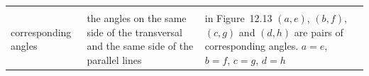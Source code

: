 \begin{center}
\begin{xtabular*}{\mytablewidth}[t]{|p{3cm}|p{3cm}|p{3cm}|p{20\mystarwidth}|}
\begin{center}
    \end{center}



    \addtocounter{footnote}{-0}
    
     \tabularnewline{}
    
    
        corresponding angles &
    
    
        the angles on the same side of the transversal and the same side of the parallel lines &
    
    
        in Figure~12.13 \begin{math}\left(a,e\right)\end{math}, \begin{math}\left(b,f\right)\end{math}, \begin{math}\left(c,g\right)\end{math} and \begin{math}\left(d,h\right)\end{math} are pairs of corresponding angles.  \begin{math}a=e\end{math}, \begin{math}b=f\end{math}, \begin{math}c=g\end{math}, \begin{math}d=h\end{math} &
    
    
        

\end{xtabular*}
\end{center}
